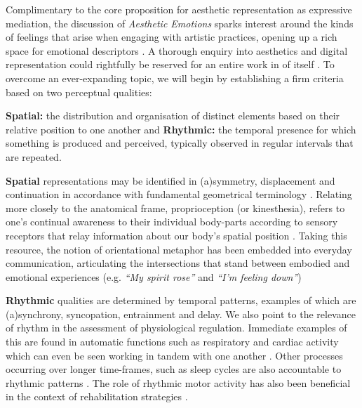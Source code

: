 Complimentary to the core proposition for aesthetic representation as expressive mediation, the discussion of \textit{Aesthetic Emotions} sparks interest around the kinds of feelings that arise when engaging with artistic practices, opening up a rich space for emotional descriptors \cite{schindler_measuring_2017,fingerhut_aesthetic_2020}. A thorough enquiry into aesthetics and digital representation could rightfully be reserved for an entire work in of itself \cite{carvalhais_art_2022}
. To overcome an ever-expanding topic, we will begin by establishing a firm criteria based on two perceptual qualities:

\textbf{Spatial:} the distribution and organisation of distinct elements based on their relative position to one another and \textbf{Rhythmic:} the temporal presence for which something is produced and perceived, typically observed in regular intervals that are repeated.

\textbf{Spatial} representations may be identified in (a)symmetry, displacement and continuation in accordance with fundamental geometrical terminology \cite{mcmanus_symmetry_2005,boselie_general_1984}. Relating more closely to the anatomical frame, proprioception (or kinesthesia), refers to one's continual awareness to their individual body-parts according to sensory receptors that relay information about our body's spatial position \cite{lamkin-kennard_sensors_2019}. Taking this resource, the notion of orientational metaphor has been embedded into everyday communication, articulating the intersections that stand between embodied and emotional experiences \citep{gow_spatial_2001,zlatev_phenomenology_2010} (e.g. \textit{“My spirit rose”} and \textit{“I’m feeling down”})

\textbf{Rhythmic} qualities are determined by temporal patterns, examples of which are (a)synchrony, syncopation, entrainment and delay. We also point to the relevance of rhythm in the assessment of physiological regulation. Immediate examples of this are found in automatic functions such as respiratory and cardiac activity \cite{moser_phase_1995} which can even be seen working in tandem with one another \cite{scholkmann_pulse-respiration_2019}. Other processes occurring over longer time-frames, such as sleep cycles are also accountable to rhythmic patterns \cite{moser_why_2006}. The role of rhythmic motor activity has also been beneficial in the context of rehabilitation strategies \cite{fujii_role_2014}.

